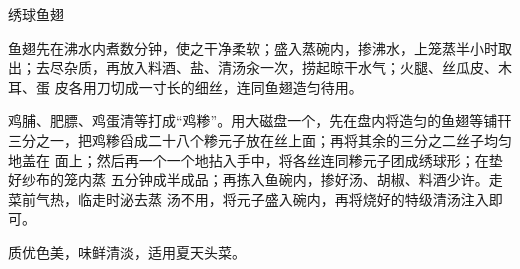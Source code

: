 \begin{recipe}{绣球鱼翅}

\ingredients


\preparation

\step 鱼翅先在沸水内煮数分钟，使之干净柔软；盛入蒸碗内，掺沸水，上笼蒸半小时取
出；去尽杂质，再放入料酒、盐、清汤汆一次，捞起晾干水气；火腿、丝瓜皮、木耳、蛋
皮各用刀切成一寸长的细丝，连同鱼翅造匀待用。

\step 鸡脯、肥膘、鸡蛋清等打成“鸡糁”。用大磁盘一个，先在盘内将造匀的鱼翅等铺幵
三分之一，把鸡糁舀成二十八个糁元子放在丝上面；再将其余的三分之二丝子均匀地盖在
面上；然后再一个一个地拈入手中，将各丝连同糁元子团成绣球形；在垫好纱布的笼内蒸
五分钟成半成品；再拣入鱼碗内，掺好汤、胡椒、料酒少许。走菜前气热，临走时泌去蒸
汤不用，将元子盛入碗内，再将烧好的特级清汤注入即可。

\features

质优色美，味鲜清淡，适用夏天头菜。

\end{recipe}

